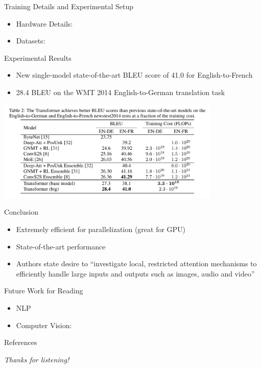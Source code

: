\documentclass[
  notheorems,
  aspectratio=54,
]{beamer}
\begin{document}
\begin{frame}{Training Details and Experimental Setup}
  \begin{itemize}
    \item Hardware Details:
    \item Datasets:
  \end{itemize}
\end{frame}

\begin{frame}{Experimental Results}
  \begin{itemize}
    \item New single-model state-of-the-art BLEU score of 41.0 for English-to-French
    \item 28.4 BLEU on the WMT 2014 English-to-German translation task
  \end{itemize}
  \center
  \includegraphics[width=0.8\textwidth]{result.png}
\end{frame}

\begin{frame}{Conclusion}
  \begin{itemize}
    \item Extremely efficient for parallelization (great for GPU)
    \item State-of-the-art performance
    \item Authors state desire to “investigate local, restricted attention mechanisms to efficiently handle large inputs and outputs such as images, audio and video”
  \end{itemize}
\end{frame}

\begin{frame}{Future Work for Reading}
  \begin{itemize}
    \item NLP
    \item Computer Vision:
  \end{itemize}
\end{frame}

\nocite{*}
\begin{frame}{References}
    \printbibliography
\end{frame}


\begin{frame}{}
  \centering \Huge
  \emph{Thanks for listening!}
\end{frame}
\end{document}
